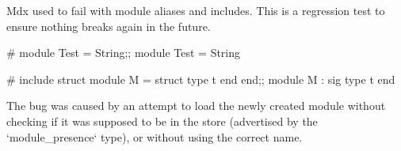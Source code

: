 Mdx used to fail with module aliases and includes. This is a regression test to
ensure nothing breaks again in the future.

\begin{ocaml}
# module Test = String;;
module Test = String
\end{ocaml}

\begin{ocaml}
# include struct module M = struct type t end end;;
module M : sig type t end
\end{ocaml}

The bug was caused by an attempt to load the newly created module without
checking if it was supposed to be in the store (advertised by the
`module_presence` type), or without using the correct name.

